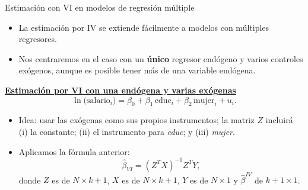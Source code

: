 \documentclass[10pt]{beamer}
\begin{document}
\begin{frame}{Estimaci\'on con VI en modelos de regresi\'on m\'ultiple}
    \begin{itemize}
        \item La estimaci\'on por IV se extiende f\'acilmente a modelos con m\'\'ultiples regresores.
        \item Nos centraremos en el caso con un \textbf{\'unico} regresor end\'ogeno y varios controles ex\'ogenos, aunque es posible tener m\'as de una variable end\'ogena.
    \end{itemize}

    \underline{\textbf{Estimaci\'on por VI con una end\'ogena y varias ex\'ogenas}}\\[4pt]
    $$
    \ln \bigl(\text{salario}_{i}\bigr)=\beta_{0}+\beta_{1}\, \text{educ}_{i}+\beta_{2}\, \text{mujer}_{i}+u_{i}.
    $$
    \begin{itemize}
        \item Idea: usar las ex\'ogenas como sus propios instrumentos; la matriz $Z$ incluir\'a (i) la constante; (ii) el instrumento para \textit{educ}; y (iii) \textit{mujer}.
        \item Aplicamos la f\'ormula anterior:
        $$
        \hat{\beta}_{VI}=(Z^{T}X)^{-1}Z^{T}Y,
        $$
        donde $Z$ es de $N\times k+1$, $X$ es de $N\times k+1$, $Y$ es de $N\times 1$ y $\hat{\beta}^{IV}$ de $k+1\times 1$.
    \end{itemize}
\end{frame}

\end{document}

